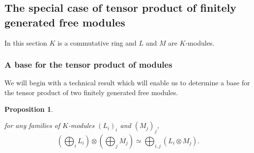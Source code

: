 \documentclass{report}
\newtheorem{prop}{Proposition}
\theoremstyle{definition}
\theoremstyle{remark}
\begin{document}
\subsection{The special case of tensor product of finitely generated free modules}
In this section $K$ is a commutative ring and $L$ and $M$ are $K$-modules. 

\bigskip

\subsubsection{A base for the tensor product of modules}
We will begin with a technical result which will enable us to determine a base for the tensor product of two finitely generated free modules. 


\begin{prop}\label{direct sum is distributive wrt tensor product}

                for any families of $K$-modules $(L_i)_i$ and $(M_j)_j$,
                \begin{equation*}
                        (\bigoplus_{i} L_i) \otimes (\bigoplus_{j} M_j) \simeq \bigoplus_{i,j} (L_i \otimes M_j).
                \end{equation*}
        \end{prop}
\end{document}
